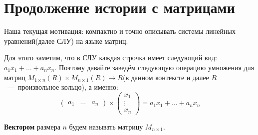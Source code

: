 \section{Продолжение истории с матрицами}
Наша текущая мотивация: компактно и точно описывать системы линейных уравнений(далее СЛУ) на языке матриц.

Для этого заметим, что в СЛУ каждая строчка имеет следующий вид: $a_1x_1 +\dots+ a_nx_n$.
Поэтому давайте заведём следующую операцию умножения для матриц $M_{1\times n}(R) \times M_{n\times 1}(R)\rightarrow R$(в данном контексте и далее $R$~---~произвольное кольцо),
а именно: 
$$
\begin{pmatrix}
    a_1&\dots&a_n
\end{pmatrix} \times
\begin{pmatrix}
    x_1\\\vdots\\x_n
\end{pmatrix}=
a_1x_1 +\dots+ a_nx_n$$

\begin{defn}[Вектор]
    \textbf{Вектором} размера $n$ будем называть матрицу $M_{n\times 1}$.
\end{defn}

